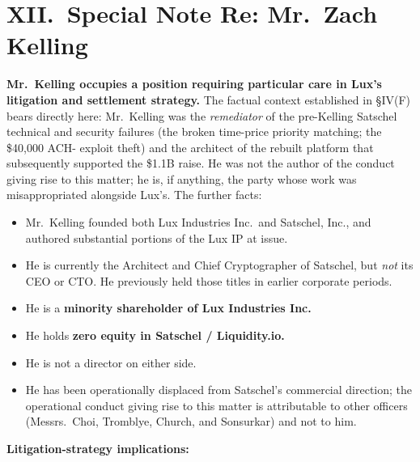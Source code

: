 \documentclass[11pt,letterpaper]{article}
\begin{document}
\section*{XII.\ Special Note Re: Mr.\ Zach Kelling}

\textbf{Mr.\ Kelling occupies a position requiring particular care
in Lux's litigation and settlement strategy.} The factual context
established in \S IV(F) bears directly here: Mr.\ Kelling was the
\emph{remediator} of the pre-Kelling Satschel technical and security
failures (the broken time-price priority matching; the \$40,000 ACH-
exploit theft) and the architect of the rebuilt platform that
subsequently supported the \$1.1B raise. He was not the author of
the conduct giving rise to this matter; he is, if anything, the
party whose work was misappropriated alongside Lux's. The further
facts:

\begin{itemize}[leftmargin=1.5em,itemsep=0.1em]
\item Mr.\ Kelling founded both Lux Industries Inc.\ and Satschel,
Inc., and authored substantial portions of the Lux IP at issue.
\item He is currently the Architect and Chief Cryptographer of
Satschel, but \emph{not} its CEO or CTO. He previously held those
titles in earlier corporate periods.
\item He is a \textbf{minority shareholder of Lux Industries Inc.}
\item He holds \textbf{zero equity in Satschel / Liquidity.io.}
\item He is not a director on either side.
\item He has been operationally displaced from Satschel's
commercial direction; the operational conduct giving rise to this
matter is attributable to other officers (Messrs.\ Choi, Tromblye,
Church, and Sonsurkar) and not to him.
\end{itemize}

\textbf{Litigation-strategy implications:}
\end{document}
